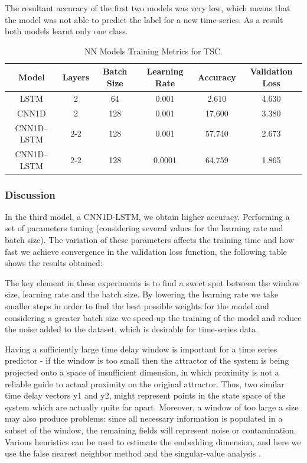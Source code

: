 The resultant accuracy of the first two models was very low, which means that the model was not able to predict the label for a new time-series. As a result both models learnt only one class.

\begin{table}[h]
	\centering
	\tiny
	\begin{tabular}{|c|c|c|c|c|c|}
		\hline
		Model        & Layers & Batch Size & Learning Rate & Accuracy & Validation Loss \\ \hline
		LSTM         & 2      &  64        & 0.001         &  2.610   & 4.630           \\
		CNN1D        & 2      & 128        & 0.001         & 17.600   & 3.380           \\
		CNN1D--LSTM  & 2-2    & 128        & 0.001         & 57.740   & 2.673           \\ 		
		CNN1D--LSTM  & 2-2    & 128        & 0.0001		   & 64.759   & 1.865           \\ \hline		
	\end{tabular}
\caption{NN Models Training Metrics for TSC.}
\label{Table:DLModels}
\end{table}

\subsubsection{Discussion}
In the third model, a CNN1D-LSTM, we obtain higher accuracy. Performing a set of parameters tuning (considering several values for the learning rate and batch size). The variation of these parameters affects the training time and how fast we achieve convergence in the validation loss function, the following table shows the results obtained:

The key element in these experiments is to find a sweet spot between the window size, learning rate and the batch size. By lowering the learning rate we take smaller steps in order to find the best possible weights for the model and considering a greater batch size we speed-up the training of the model and reduce the noise added to the dataset, which is desirable for time-series data.

Having a sufficiently large time delay window is important for a time series predictor - if the window is too small then the attractor of the system is being projected onto a space of insufficient dimension, in which proximity is not a reliable guide to actual proximity on the original attractor. Thus, two similar time delay vectors y1 and y2, might represent points in the state space of the system which are actually quite far apart.  Moreover, a window of too large a size may also produce problems: since all necessary information is populated in a subset of the window, the remaining fields will represent noise or contamination.  Various heuristics can be used to estimate the embedding dimension, and here we use the false nearest neighbor method and the singular-value analysis \cite{Fawaz2019}.


